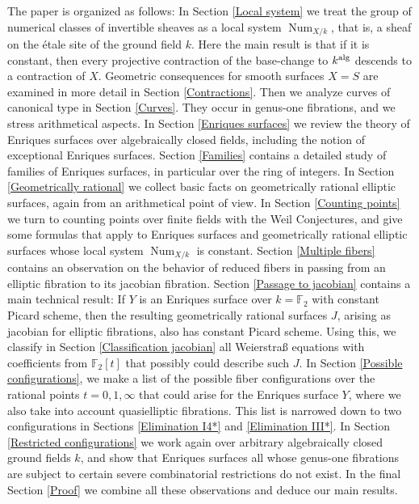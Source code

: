 \documentclass[oneside, 12pt]{amsart}
\theoremstyle{definition}
\theoremstyle{remark}
\newcommand{\FF}{\mathbb{F}}
\newcommand{\alg}{\text{\rm alg}}
\newcommand{\Num}{\operatorname{Num}}
\begin{document}
The paper is organized as follows:
In Section \ref{Local system} we treat the group of numerical classes of invertible
sheaves as a local system $\Num_{X/k}$, that is, a sheaf on the \'etale site of the ground field $k$. 
Here the main result is that if it is constant,
then every projective contraction of the base-change to $k^\alg$ descends to a contraction of
$X$.
Geometric consequences for smooth surfaces $X=S$ are examined in more detail in Section \ref{Contractions}.
Then we analyze curves of canonical type in Section \ref{Curves}. They 
occur in genus-one fibrations, and we stress   arithmetical aspects.  
In Section \ref{Enriques surfaces} we review the theory of Enriques surfaces over algebraically closed fields, including
the notion of exceptional Enriques surfaces. Section \ref{Families} contains a detailed study of families  of Enriques surfaces,
in particular over the ring of integers.
In Section \ref{Geometrically rational} 
we collect basic facts on geometrically rational elliptic surfaces, again from an arithmetical point of view.
In Section \ref{Counting points}   we turn to counting points over finite fields with the Weil Conjectures,
and give some formulas that apply to Enriques surfaces and geometrically rational elliptic surfaces
whose local system $\Num_{X/k}$ is constant.
Section \ref{Multiple fibers} contains an observation on the behavior of reduced fibers in passing from
an elliptic fibration to its jacobian fibration.
Section \ref{Passage to jacobian} contains a main technical result: If $Y$ is an   Enriques surface over $k=\FF_2$
with constant Picard scheme, then the resulting geometrically rational surfaces $J$, arising as jacobian for
elliptic fibrations, also has constant Picard scheme.
Using this, we classify in Section \ref{Classification jacobian} all Weierstra\ss{} equations with coefficients from $\FF_2[t]$ that
possibly could describe such $J$. In Section \ref{Possible configurations}, we make a list of the possible fiber configurations
over the rational points $t=0,1,\infty$ that could arise for the Enriques surface $Y$,
where we also take into account quasielliptic fibrations.
This list is narrowed down to two configurations in Sections  \ref{Elimination I4*} and \ref{Elimination III*}.
In Section \ref{Restricted configurations} we   work again over arbitrary algebraically closed ground fields $k$, and show that
Enriques surfaces all whose genus-one fibrations are subject to certain severe combinatorial restrictions do not exist.
In the final Section \ref{Proof} we combine all these observations and deduce  our main results.
\end{document}
